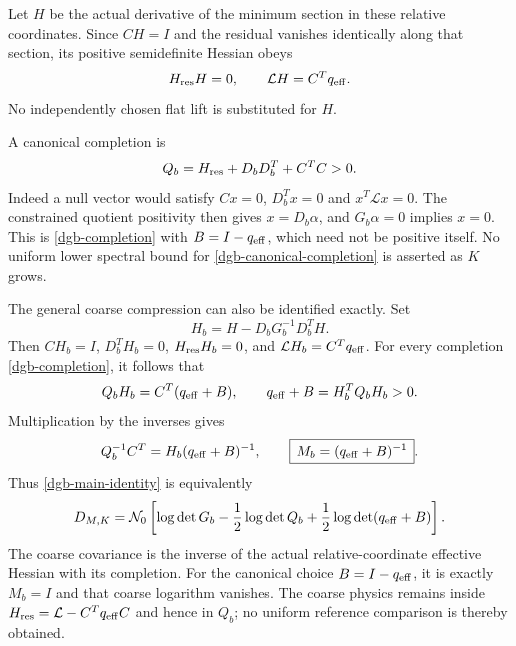 \documentclass[11pt]{article}
\theoremstyle{remark}
\begin{document}
Let $H$ be the actual derivative of the minimum section in
these relative coordinates. Since $CH=I$ and the residual
vanishes identically along that section, its positive
semidefinite Hessian obeys
\begin{equation}
                     H_{\rm res}H=0,\qquad
                     \mathcal LH=C^Tq_{\rm eff}.
 \label{dgb-residual-lift}
\end{equation}
No independently chosen flat lift is substituted for $H$.

A canonical completion is
\begin{equation}
                Q_b=H_{\rm res}+D_bD_b^T+C^TC>0.
 \label{dgb-canonical-completion}
\end{equation}
Indeed a null vector would satisfy $Cx=0$, $D_b^Tx=0$
and $x^T\mathcal Lx=0$. The constrained quotient positivity
then gives $x=D_b\alpha$, and $G_b\alpha=0$ implies $x=0$.
This is \eqref{dgb-completion} with $B=I-q_{\rm eff}$,
which need not be positive itself. No uniform lower
spectral bound for \eqref{dgb-canonical-completion} is
asserted as $K$ grows.

The general coarse compression can also be identified
exactly. Set
\begin{equation}
                   H_b=H-D_bG_b^{-1}D_b^TH .
 \label{dgb-adjusted-lift}
\end{equation}
Then $CH_b=I$, $D_b^TH_b=0$, $H_{\rm res}H_b=0$, and
$\mathcal LH_b=C^Tq_{\rm eff}$. For every completion
\eqref{dgb-completion}, it follows that
\begin{equation}
 Q_bH_b=C^T(q_{\rm eff}+B),\qquad
 q_{\rm eff}+B=H_b^TQ_bH_b>0.
 \label{dgb-effective-Schur}
\end{equation}
Multiplication by the inverses gives
\begin{equation}
 Q_b^{-1}C^T=H_b(q_{\rm eff}+B)^{-1},\qquad
 \boxed{\,M_b=(q_{\rm eff}+B)^{-1}\,}.
 \label{dgb-coarse-identification}
\end{equation}
Thus \eqref{dgb-main-identity} is equivalently
\begin{equation}
 D_{M,K}=\mathcal N_0\left[
      \log\det G_b-\frac12\log\det Q_b
                   +\frac12\log\det(q_{\rm eff}+B)\right].
 \label{dgb-effective-determinant}
\end{equation}
The coarse covariance is the inverse of the actual
relative-coordinate effective Hessian with its completion.
For the canonical choice $B=I-q_{\rm eff}$, it is exactly
$M_b=I$ and that coarse logarithm vanishes. The coarse
physics remains inside
$H_{\rm res}=\mathcal L-C^Tq_{\rm eff}C$ and hence in $Q_b$;
no uniform reference comparison is thereby obtained.
\end{document}
